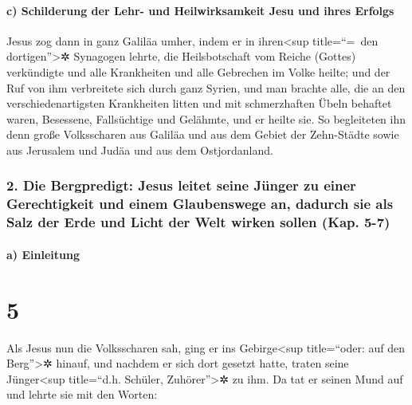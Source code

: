 \hypertarget{c-schilderung-der-lehr--und-heilwirksamkeit-jesu-und-ihres-erfolgs}{%
\paragraph{c) Schilderung der Lehr- und Heilwirksamkeit Jesu und ihres
Erfolgs}\label{c-schilderung-der-lehr--und-heilwirksamkeit-jesu-und-ihres-erfolgs}}

 Jesus zog dann in ganz Galiläa umher, indem er in
ihren\textless sup title=``=~den dortigen''\textgreater✲ Synagogen
lehrte, die Heilsbotschaft vom Reiche (Gottes) verkündigte und alle
Krankheiten und alle Gebrechen im Volke heilte;  und der
Ruf von ihm verbreitete sich durch ganz Syrien, und man brachte alle,
die an den verschiedenartigsten Krankheiten litten und mit schmerzhaften
Übeln behaftet waren, Besessene, Fallsüchtige und Gelähmte, und er
heilte sie.  So begleiteten ihn denn große Volksscharen
aus Galiläa und aus dem Gebiet der Zehn-Städte sowie aus Jerusalem und
Judäa und aus dem Ostjordanland.

\hypertarget{die-bergpredigt-jesus-leitet-seine-juxfcnger-zu-einer-gerechtigkeit-und-einem-glaubenswege-an-dadurch-sie-als-salz-der-erde-und-licht-der-welt-wirken-sollen-kap.-5-7}{%
\subsubsection{2. Die Bergpredigt: Jesus leitet seine Jünger zu einer
Gerechtigkeit und einem Glaubenswege an, dadurch sie als Salz der Erde
und Licht der Welt wirken sollen (Kap.
5-7)}\label{die-bergpredigt-jesus-leitet-seine-juxfcnger-zu-einer-gerechtigkeit-und-einem-glaubenswege-an-dadurch-sie-als-salz-der-erde-und-licht-der-welt-wirken-sollen-kap.-5-7}}

\hypertarget{a-einleitung}{%
\paragraph{a) Einleitung}\label{a-einleitung}}

\hypertarget{section-4}{%
\section{5}\label{section-4}}

 Als Jesus nun die Volksscharen sah, ging er ins
Gebirge\textless sup title=``oder: auf den Berg''\textgreater✲ hinauf,
und nachdem er sich dort gesetzt hatte, traten seine Jünger\textless sup
title=``d.h. Schüler, Zuhörer''\textgreater✲ zu ihm.  Da
tat er seinen Mund auf und lehrte sie mit den Worten:

